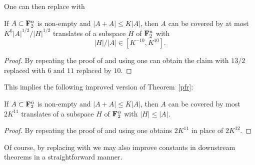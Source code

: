 One can then replace  with

\begin{lemma}\label{pfr_aux-improv}\leanok
If $A \subset {\bf F}_2^n$ is non-empty and
$|A+A| \leq K|A|$, then $A$ can be covered by at most $K^6 |A|^{1/2}/|H|^{1/2}$ translates of a subspace $H$ of ${\bf F}_2^n$ with
$$
  |H|/|A| \in [K^{-10}, K^{10}].
$$
\end{lemma}

\begin{proof}\leanok
By repeating the proof of  and using  one can obtain the claim with $13/2$
replaced with $6$ and $11$ replaced by $10$.
\end{proof}

This implies the following improved version of Theorem~\ref{pfr}:

\begin{theorem}\label{pfr-improv}\leanok
  If $A \subset {\bf F}_2^n$ is non-empty and $|A+A| \leq K|A|$, then $A$ can be covered by most $2K^{11}$ translates of a subspace $H$ of ${\bf F}_2^n$ with $|H| \leq |A|$.
\end{theorem}

\begin{proof}\leanok
By repeating the proof of  and using  one obtains $2K^{11}$ in place of $2K^{12}$.
\end{proof}

Of course, by replacing  with  we may also improve constants in downstream theorems in a straightforward manner.
